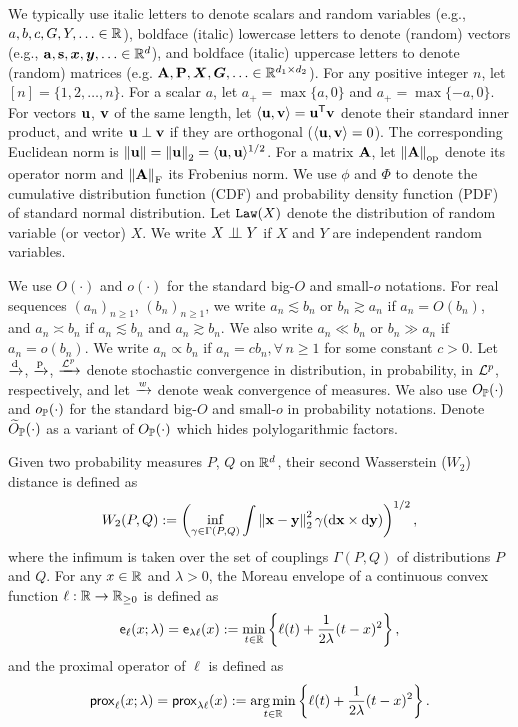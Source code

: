 We typically use italic letters to denote scalars and random variables (e.g., $a, b, c, G, Y, \ldots \in \R$), boldface (italic) lowercase letters to denote (random) vectors (e.g., $\ba, \bs, \xx, \yy,  \ldots \in \R^d$), and boldface (italic) uppercase letters to denote (random) matrices (e.g. $\bA, \bP, \XX, \GG,  \ldots \in \R^{d_1 \times d_2}$). For any positive integer $n$, let $[n] = \{1, 2, \ldots, n\}$. For a scalar $a$, let $a_+ = \max\{ a, 0 \}$ and $a_+ = \max\{ -a, 0 \}$. For vectors $\bu$, $\bv$ of the same length, let $\< \bu, \bv \> = \bu^\top \bv$ denote their standard inner product, and write $\bu \perp \bv$ if they are orthogonal ($\< \bu, \bv \> = 0$). The corresponding Euclidean norm is $\norm{\bu} = \norm{\bu}_2 = \< \bu, \bu \>^{1/2}$. For a matrix $\bA$, let $\norm{\bA}_{\mathrm{op}}$ denote its operator norm and $\norm{\bA}_\mathrm{F}$ its Frobenius norm. We use $\phi$ and $\Phi$ to denote the cumulative distribution function (CDF) and probability density function (PDF) of standard normal distribution. Let $\Law(X)$ denote the distribution of random variable (or vector) $X$. We write $X \indep Y$ if $X$ and $Y$ are independent random variables.

We use $O(\cdot)$ and $o(\cdot)$ for the standard big-$O$ and small-$o$ notations. For real sequences $(a_n)_{n \ge 1}$, $(b_n)_{n \ge 1}$, we write $a_n \lesssim b_n$ or  $b_n \gtrsim a_n$ if $a_n = O(b_n)$, and $a_n \asymp b_n$ if $a_n \lesssim b_n$ and $a_n \gtrsim b_n$. We also write $a_n \ll b_n$ or $b_n \gg a_n$ if $a_n = o(b_n)$. We write $a_n \propto b_n$ if $a_n = c b_n, \forall\, n \ge 1$ for some constant $c > 0$. Let $\cond$, $\conp$, $\conL{p}$ denote stochastic convergence in distribution, in probability, in $\cL^p$, respectively, and let $\conw$ denote weak convergence of measures. We also use $O_{\P}(\cdot)$ and $o_{\P}(\cdot)$ for the standard big-$O$ and small-$o$ in probability notations. Denote $\wt O_{\P}(\cdot)$ as a variant of $O_{\P}(\cdot)$ which hides polylogarithmic factors. 

Given two probability measures $P$, $Q$ on $\R^d$, their second Wasserstein ($W_2$) distance is defined as
\begin{equation*}
    W_2(P, Q) := \left( \inf_{\gamma \in \Gamma(P, Q) }
    \int \norm{\bx - \by}_2^2 \gamma(\d\bx \times \d\by)
    \right)^{1/2},
\end{equation*}
where the infimum is taken over the set of couplings $\Gamma(P, Q)$ of distributions $P$ and $Q$. For any $x \in \R$ and $\lambda > 0$, the Moreau envelope of a continuous convex function $\ell: \R \to \R_{\ge 0}$ is defined as
\begin{equation*}
    \envelope_\ell(x; \lambda) = \envelope_{\lambda\ell}(x)
    := \min_{t \in \R} \left\{  \ell(t) +  \frac1{2\lambda} (t - x)^2 \right\},
\end{equation*}
and the proximal operator of $\ell$ is defined as
\begin{equation*}
    \prox_{\ell}(x; \lambda) =
    \prox_{\lambda \ell}(x) := \argmin_{t \in \R} \left\{ \ell(t) +  \frac1{2\lambda} (t - x)^2 \right\}.
\end{equation*}



